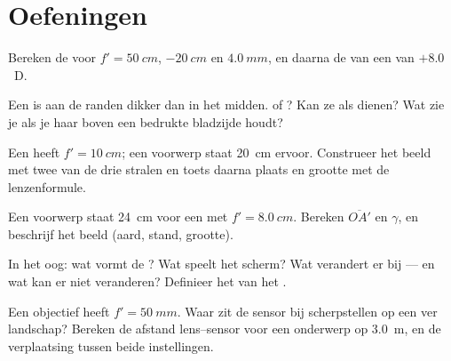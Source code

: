 \section{Oefeningen}

\begin{exercise}[$\star$]\label{exo:g11:lenses-and-eye:1}
Bereken de  voor $f' = \qty{50}{cm}$, $\qty{-20}{cm}$ en
$\qty{4.0}{mm}$, en daarna de  van een  van
$+8.0$~D.
\end{exercise}

\begin{exercise}[$\star$]\label{exo:g11:lenses-and-eye:2}
Een  is aan de randen dikker dan in het midden.  of
? Kan ze als  dienen? Wat zie je als je haar boven een
bedrukte bladzijde houdt?
\end{exercise}

\begin{exercise}[$\star$]\label{exo:g11:lenses-and-eye:3}
Een  heeft $f' = \qty{10}{cm}$; een voorwerp staat
\qty{20}{cm} ervoor. Construeer het beeld met twee van de drie stralen en
toets daarna plaats en grootte met de lenzenformule.
\end{exercise}

\begin{exercise}[$\star$]\label{exo:g11:lenses-and-eye:4}
Een voorwerp staat \qty{24}{cm} voor een  met
$f' = \qty{8.0}{cm}$. Bereken $\overline{OA'}$ en $\gamma$, en beschrijf
het beeld (aard, stand, grootte).
\end{exercise}

\begin{exercise}[$\star$]\label{exo:g11:lenses-and-eye:5}
In het oog: wat vormt de ? Wat speelt het scherm? Wat
verandert er bij  --- en wat kan er niet veranderen?
Definieer het  van het .
\end{exercise}

\begin{exercise}[$\star\star$]\label{exo:g11:lenses-and-eye:6}
Een objectief heeft $f' = \qty{50}{mm}$. Waar zit de sensor bij
scherpstellen op een ver landschap? Bereken de afstand lens--sensor voor
een onderwerp op \qty{3.0}{m}, en de verplaatsing tussen beide
instellingen.
\end{exercise}


